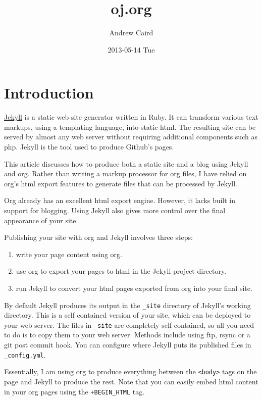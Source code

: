 \documentclass{article}
\title{oj.org}
\author{Andrew Caird}
\date{2013-05-14 Tue}
\begin{document}
\maketitle

\setcounter{tocdepth}{3}
\tableofcontents
\vspace*{1cm}

\section{Introduction}
\label{sec-1}


\href{http://wiki.github.com/mojombo/jekyll}{Jekyll} is a static web site
generator written in Ruby. It can transform various text markups, using
a templating language, into static html. The resulting site can be
served by almost any web server without requiring additional components
such as php. Jekyll is the tool used to produce Github's pages.

This article discusses how to produce both a static site and a blog
using Jekyll and org. Rather than writing a markup processor for org
files, I have relied on org's html export features to generate files
that can be processed by Jekyll.

Org already has an excellent html export engine. However, it lacks built
in support for blogging. Using Jekyll also gives more control over the
final appearance of your site.

Publishing your site with org and Jekyll involves three steps:

\begin{enumerate}
\item write your page content using org.
\item use org to export your pages to html in the Jekyll project directory.
\item run Jekyll to convert your html pages exported from org into your
   final site.
\end{enumerate}

By default Jekyll produces its output in the \texttt{\_site} directory of
Jekyll's working directory. This is a self contained version of your
site, which can be deployed to your web server. The files in \texttt{\_site} are
completely self contained, so all you need to do is to copy them to your
web server. Methods include using ftp, rsync or a git post commit hook.
You can configure where Jekyll puts its published files in
\texttt{\_config.yml}.

Essentially, I am using org to produce everything between the \texttt{<body>}
tags on the page and Jekyll to produce the rest. Note that you can
easily embed html content in your org pages using the \texttt{+BEGIN\_HTML} tag.
\end{document}
